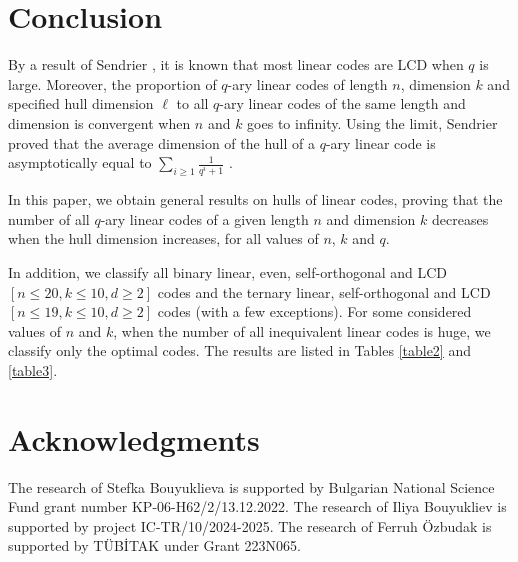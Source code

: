 \documentclass[a4paper,11pt]{article}
\begin{document}
\section{Conclusion}
\label{sec_conclusion}

By a result of Sendrier \cite{Sendrier_hull}, it is known that most linear codes are LCD when $q$ is large. Moreover, the proportion of $q$-ary linear codes of length $n$, dimension $k$ and specified hull dimension $\ell$ to all $q$-ary linear codes of the same length and dimension is convergent when $n$ and $k$ goes to infinity. Using the limit, Sendrier proved that the average dimension of the hull of a $q$-ary linear code is asymptotically equal to $\sum_{i\ge 1}\frac{1}{q^i+1}$ \cite{Sendrier_hull}.

In this paper, we obtain general results on hulls of linear codes, proving that the number of all $q$-ary linear codes of a given length $n$ and dimension $k$ decreases when the hull dimension increases, for all values of $n$, $k$ and $q$.

In addition, we classify all binary linear, even, self-orthogonal and LCD $[n\le 20, k\le 10, d\ge 2]$ codes and the ternary linear, self-orthogonal and LCD
$[n\le 19, k\le 10, d\ge 2]$ codes (with a few exceptions). For some considered values of $n$ and $k$, when the number of all inequivalent linear codes is huge, we classify only the optimal codes. The results are listed in Tables \ref{table2} and \ref{table3}.


\section*{Acknowledgments}
The research of Stefka Bouyuklieva is supported by Bulgarian National Science Fund grant number KP-06-H62/2/13.12.2022. The research of Iliya Bouyukliev is supported by project IC-TR/10/2024-2025. The research of Ferruh \"{O}zbudak is supported by T\"{U}B\.{I}TAK under Grant 223N065.
	
%
%

	
\end{document}
